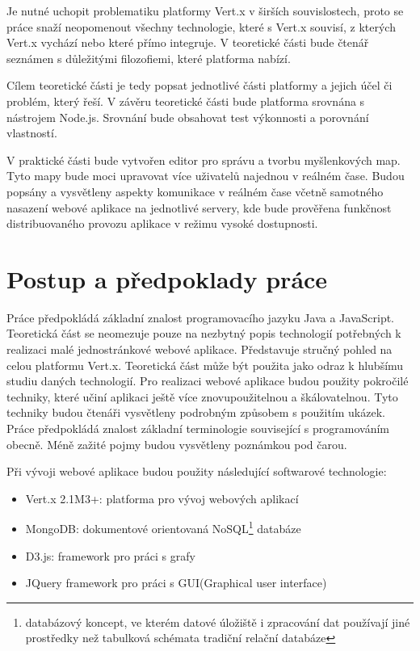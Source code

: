 Je nutné uchopit problematiku platformy Vert.x v širších souvislostech, proto se práce snaží neopomenout všechny technologie, které s Vert.x souvisí, z kterých Vert.x vychází nebo které přímo integruje. V teoretické části bude čtenář seznámen s důležitými filozofiemi, které platforma nabízí. %

Cílem teoretické části je tedy popsat jednotlivé části platformy a jejich účel či problém, který řeší. V závěru teoretické části bude platforma srovnána s nástrojem Node.js. Srovnání bude obsahovat test výkonnosti a porovnání vlastností.

V praktické části bude vytvořen editor pro správu a tvorbu myšlenkových map. Tyto mapy bude moci upravovat více uživatelů najednou v reálném čase. Budou popsány a vysvětleny aspekty komunikace v reálném čase včetně samotného nasazení webové aplikace na jednotlivé servery, kde bude prověřena funkčnost distribuovaného provozu aplikace v režimu vysoké dostupnosti.

\section{Postup a předpoklady práce}

Práce předpokládá základní znalost programovacího jazyku Java a JavaScript. Teoretická část se neomezuje pouze na nezbytný popis technologií potřebných k realizaci malé jednostránkové webové aplikace. Představuje stručný pohled na celou platformu Vert.x. Teoretická část může být použita jako odraz k hlubšímu studiu daných technologií. Pro realizaci webové aplikace budou použity pokročilé techniky, které učiní aplikaci ještě více znovupoužitelnou a škálovatelnou. Tyto techniky budou čtenáři vysvětleny podrobným způsobem s použitím ukázek. Práce předpokládá znalost základní terminologie související s programováním obecně. Méně zažité pojmy budou vysvětleny poznámkou pod čarou.

Při vývoji webové aplikace budou použity následující softwarové technologie:
\begin{itemize}
\item Vert.x 2.1M3+: platforma pro vývoj webových aplikací
\item MongoDB: dokumentové orientovaná NoSQL\footnote{databázový koncept, ve kterém datové úložiště i zpracování dat používají jiné prostředky než tabulková schémata tradiční relační databáze} databáze
\item D3.js: framework pro práci s grafy
\item JQuery framework pro práci s GUI(Graphical user interface)
\end{itemize}